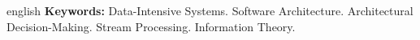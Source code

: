 \begin{resumo}[Abstract]
\begin{otherlanguage*}{english}
\textbf{Keywords:} Data-Intensive Systems. Software Architecture. Architectural Decision-Making. Stream Processing. Information Theory.



\end{otherlanguage*}
\end{resumo}
